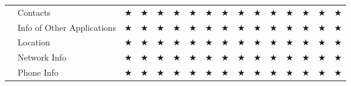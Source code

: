 \documentclass[sigconf,balance=false]{acmart}
\def\checkmark{{\footnotesize $\bigstar$}}
\begin{document}
\begin{table*}[h]
\begin{tabular}{p{3.0cm}p{4.7cm}llllllllllllll}
                                                                                                     &Contacts                              &\checkmark            &\checkmark                           &\checkmark                 &\checkmark                  &\checkmark                &\checkmark             &\checkmark                &\checkmark                   &\checkmark                   &\checkmark                &\checkmark             &\checkmark             &\checkmark              &\checkmark                      \\
                                                                                                     &Info of Other Applications            &\checkmark            &\checkmark                           &\checkmark                 &\checkmark                  &\checkmark                &\checkmark             &\checkmark                &\checkmark                   &\checkmark                   &\checkmark                &\checkmark             &\checkmark             &\checkmark              &\checkmark                      \\
                                                                                                     &Location                              &\checkmark            &\checkmark                           &\checkmark                 &\checkmark                  &\checkmark                &\checkmark             &\checkmark                &\checkmark                   &\checkmark                   &\checkmark                &\checkmark             &\checkmark             &\checkmark              &\checkmark                      \\
                                                                                                     &Network Info                          &\checkmark            &\checkmark                           &\checkmark                 &\checkmark                  &\checkmark                &\checkmark             &\checkmark                &\checkmark                   &\checkmark                   &\checkmark                &\checkmark             &\checkmark             &\checkmark              &\checkmark                      \\
                                                                                                     &Phone Info                            &\checkmark            &\checkmark                           &\checkmark                 &\checkmark                  &\checkmark                &\checkmark             &\checkmark                &\checkmark                   &\checkmark                   &\checkmark                &\checkmark             &\checkmark             &\checkmark              &\checkmark                      \\

\end{tabular}
\end{table*}
\end{document}

